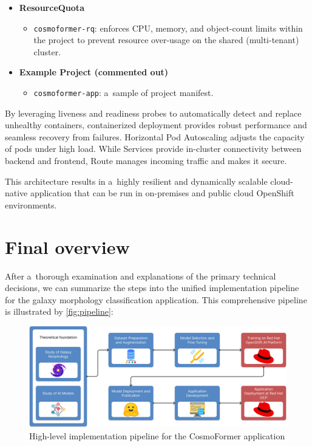 \begin{itemize}
  \item \textbf{ResourceQuota}
    \begin{itemize}
      \item \texttt{cosmoformer-rq}: enforces CPU, memory, and object-count limits within the project to prevent resource over-usage on the shared (multi-tenant) cluster.
    \end{itemize}

  \item \textbf{Example Project (commented out)}
    \begin{itemize}
      \item \texttt{cosmoformer-app}: a~sample of project manifest.
    \end{itemize}
\end{itemize}

By leveraging liveness and readiness probes to automatically detect and replace unhealthy containers, containerized deployment provides robust performance and seamless recovery from failures. Horizontal Pod Autoscaling adjusts the capacity of pods under high load. While Services provide in-cluster connectivity between backend and frontend, Route manages incoming traffic and makes it secure.

This architecture results in a~highly resilient and dynamically scalable cloud-native application that can be run in on-premises and public cloud OpenShift environments.

\section*{Final overview}

After a~thorough examination and explanations of the primary technical decisions, we can summarize the steps into the unified implementation pipeline for the galaxy morphology classification application. This comprehensive pipeline is illustrated by \autoref{fig:pipeline}:

\begin{figure}[htbp]
  \centering
  \includegraphics[width=\textwidth]{obrazky-figures/04-draft/pipeline.png}
  \caption{High-level implementation pipeline for the CosmoFormer application}
  \label{fig:pipeline}
\end{figure}

